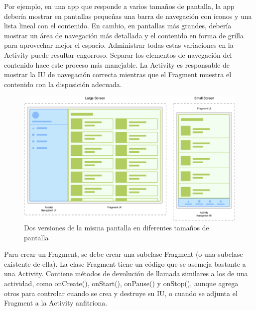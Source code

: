 Por ejemplo, en una app que responde a varios tamaños de pantalla, la app debería mostrar en pantallas pequeñas una barra de navegación con íconos y una lista lineal con el contenido. En cambio, en pantallas más grandes, debería mostrar un área de navegación más detallada y el contenido en forma de grilla para aprovechar mejor el espacio.
Administrar todas estas variaciones en la Activity puede resultar engorroso. Separar los elementos de navegación del contenido hace este proceso más manejable. La Activity es responsable de mostrar la IU de navegación correcta mientras que el Fragment muestra el contenido con la disposición adecuada.

\begin{figure}[H]
  \centering
    \includegraphics[scale=0.4]{04-framework/fragment-screen-sizes.png} 
   \caption{Dos versiones de la misma pantalla en diferentes tamaños de pantalla}
   \label{fig:umlFrameworkCore}
\end{figure}


Para crear un Fragment, se debe crear una subclase Fragment (o una subclase existente de ella). La clase Fragment tiene un código que se asemeja bastante a una Activity. Contiene métodos de devolución de llamada similares a los de una actividad, como onCreate(), onStart(), onPause() y onStop(), aunque agrega otros para controlar cuando se crea y destruye su IU, o cuando se adjunta el Fragment a la Activity anfitriona.
\cite{androidDocs}


